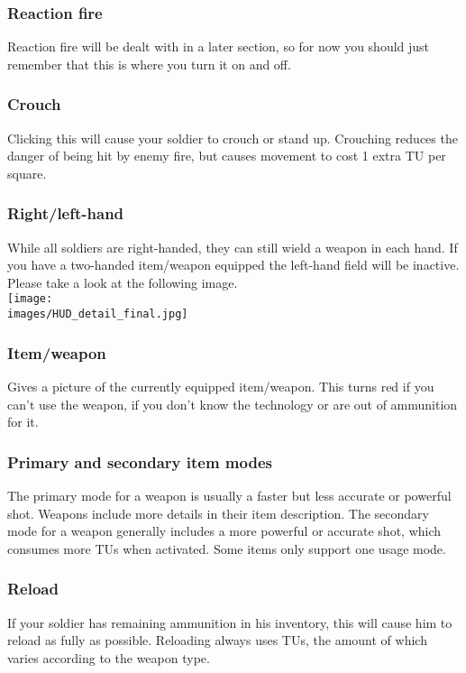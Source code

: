 \subsubsection{Reaction fire}
Reaction fire will be dealt with in a later section, so for now you should just remember that this is where you turn it on and off.

\subsubsection{Crouch}
Clicking this will cause your soldier to crouch or stand up.  Crouching reduces the danger of being hit by enemy fire, but causes movement to cost 1 extra TU per square.

\subsubsection{Right/left-hand}
While all soldiers are right-handed, they can still wield a weapon in each hand. If you have a two-handed item/weapon equipped the left-hand field will be inactive. Please take a look at the following image.\\
\texttt{[image: \\images/HUD\_detail\_final.jpg]}

\subsubsection{Item/weapon}
Gives a picture of the currently equipped item/weapon. This turns red if you can't use the weapon, if you don't know the technology or are out of ammunition for it.

\subsubsection{Primary and secondary item modes}
The primary mode for a weapon is usually a faster but less accurate or powerful shot. Weapons include more details in their item description.  The secondary mode for a weapon generally includes a more powerful or accurate shot, which consumes more TUs when activated.  Some items only support one usage mode.

\subsubsection{Reload}
If your soldier has remaining ammunition in his inventory, this will cause him to reload as fully as possible. Reloading always uses TUs, the amount of which varies according to the weapon type.

